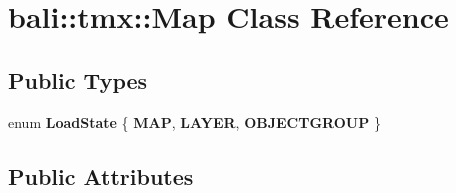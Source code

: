 \hypertarget{classbali_1_1tmx_1_1_map}{\section{bali\-:\-:tmx\-:\-:Map Class Reference}
\label{classbali_1_1tmx_1_1_map}
}
\subsection*{Public Types}
\begin{DoxyCompactItemize}
\item 
enum {\bfseries Load\-State} \{ {\bfseries M\-A\-P}, 
{\bfseries L\-A\-Y\-E\-R}, 
{\bfseries O\-B\-J\-E\-C\-T\-G\-R\-O\-U\-P}
 \}
\end{DoxyCompactItemize}
\subsection*{Public Attributes}
